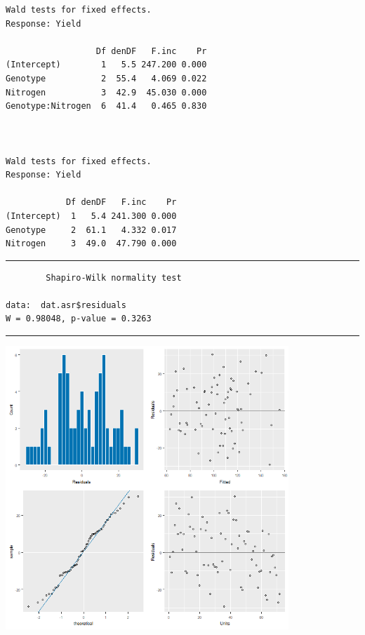 \documentclass[a4paper, 10pt, fleqn, twosided]{memoir}
\begin{document}
\begin{tcolorbox}[title = Exercise 15 output]
\begin{verbatim}
Wald tests for fixed effects.
Response: Yield

                  Df denDF   F.inc    Pr
(Intercept)        1   5.5 247.200 0.000
Genotype           2  55.4   4.069 0.022
Nitrogen           3  42.9  45.030 0.000
Genotype:Nitrogen  6  41.4   0.465 0.830



Wald tests for fixed effects.
Response: Yield

            Df denDF   F.inc    Pr
(Intercept)  1   5.4 241.300 0.000
Genotype     2  61.1   4.332 0.017
Nitrogen     3  49.0  47.790 0.000

\end{verbatim}
{\color{outpt} {\hrule height 1pt}}
\begin{verbatim}
        Shapiro-Wilk normality test

data:  dat.asr$residuals
W = 0.98048, p-value = 0.3263
\end{verbatim}
{\color{outpt} {\hrule height 1pt}} \vspace{0.2cm}

\includegraphics[width=0.8\textwidth, frame]{Exercise15Resplot2.png}
\end{tcolorbox}
\end{document}
